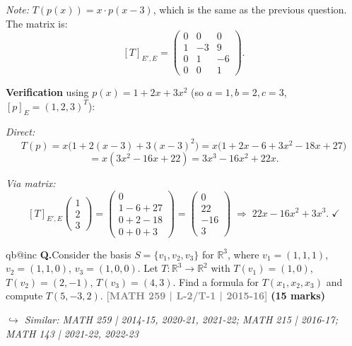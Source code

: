 \documentclass[12pt,a3paper]{article}
\makeatletter
\newcommand{\yr}[1]{\hfill\textcolor{gray}{\small\textbf{[#1]}}}
\newcommand{\mk}[1]{\textcolor{orange!70!black}{\small\textbf{(#1 marks)}}}
\newcommand{\variant}[1]{\par\vspace{1pt}\textcolor{blue!50!black}%
  {\footnotesize\textit{$\hookrightarrow$ Similar: #1}}}
\newcounter{qnum}
\newcommand{\Q}[1]{%
  \csname qb@inc\endcsname
  \needspace{4\baselineskip}
  \refstepcounter{qnum}
  \vspace{6pt}
  \noindent\textbf{Q\theqnum.}\enspace #1\par
}
\makeatother
\begin{document}
\begin{tcolorbox}[enhanced,breakable,
  colback=cF!4,colframe=cF,boxrule=0.8pt,arc=5pt,
  title={\textbf{Answer --- $T:P_2\to P_3$, $T(a+bx+cx^2)=x\bigl(a+b(x-3)+c(x-3)^2\bigr)$: Matrix \& Verify}},
  fonttitle=\bfseries\color{white},colbacktitle=cF]

\textit{Note:} $T(p(x))=x\cdot p(x-3)$, which is the same as the previous question. The matrix is:
\[
[T]_{E',E}=\begin{pmatrix}0&0&0\\1&-3&9\\0&1&-6\\0&0&1\end{pmatrix}.
\]

\textbf{Verification} using $p(x)=1+2x+3x^2$ (so $a=1,b=2,c=3$, $[p]_E=(1,2,3)^T$):

\textit{Direct:}
\[
T(p)=x\bigl(1+2(x-3)+3(x-3)^2\bigr)=x\bigl(1+2x-6+3x^2-18x+27\bigr)
\]
\[
=x(3x^2-16x+22)=3x^3-16x^2+22x.
\]

\textit{Via matrix:}
\[
[T]_{E',E}\begin{pmatrix}1\\2\\3\end{pmatrix}=\begin{pmatrix}0\\1-6+27\\0+2-18\\0+0+3\end{pmatrix}=\begin{pmatrix}0\\22\\-16\\3\end{pmatrix}
\;\Rightarrow\; 22x-16x^2+3x^3.\;\checkmark
\]

\end{tcolorbox}

\Q{Consider the basis $S = \{v_1, v_2, v_3\}$ for $\mathbb{R}^3$, where $v_1 = (1,1,1)$, $v_2 = (1,1,0)$, $v_3 = (1,0,0)$. Let $T: \mathbb{R}^3 \to \mathbb{R}^2$ with $T(v_1) = (1,0)$, $T(v_2) = (2,-1)$, $T(v_3) = (4,3)$. Find a formula for $T(x_1,x_2,x_3)$ and compute $T(5,-3,2)$.
\yr{MATH 259 | L-2/T-1 | 2015-16} \mk{15}
\variant{MATH 259 | 2014-15, 2020-21, 2021-22; MATH 215 | 2016-17; MATH 143 | 2021-22, 2022-23}}
\end{document}
